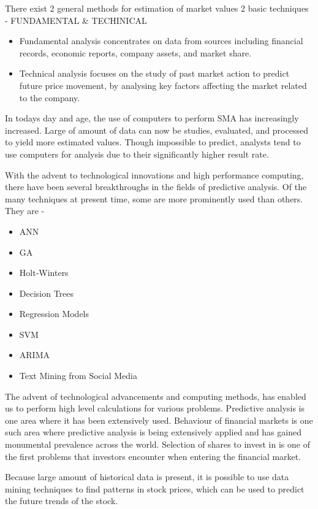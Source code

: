 \documentclass[BTech]{srmuthesis}
\begin{document}
There exist 2 general methods for estimation of market values
2 basic techniques - FUNDAMENTAL \& TECHINICAL
\begin{itemize}
		\item Fundamental analysis concentrates on data from sources including financial records, economic reports, company assets, and market share.
		\item Technical analysis focuses on the study of past market action to predict future price movement, by analysing key factors affecting the market related to the company.
\end{itemize}

In today\textquotesingle s day and age, the use of computers to perform SMA has increasingly increased. Large of amount of data can now be studies, evaluated, and processed to yield more estimated values.
Though impossible to predict, analysts tend to use computers for analysis due to their significantly higher result rate.

With the advent to technological innovations and high performance computing, there have been several breakthroughs in the fields of predictive analysis. Of the many techniques at present
time, some are more prominently used than others. They are -

\begin{itemize}
	\item \ac{ANN}
	\item \ac{GA}
	\item Holt-Winters
	\item Decision Trees
	\item Regression Models
	\item \ac{SVM}
	\item \ac{ARIMA}
	\item Text Mining from Social Media
\end{itemize}

The advent of technological advancements and computing methods, has enabled us to perform high level calculations for various problems. Predictive analysis is one area where it has been extensively used. Behaviour of financial markets is one such area where predictive analysis is being extensively applied and has gained monumental prevalence across the world. Selection of shares to invest in is one of the first problems that investors encounter when entering the financial market. 

Because large amount of historical data is present, it is possible to use data mining techniques to find patterns in stock prices, which can be used to predict the future trends of the stock.
\end{document}
